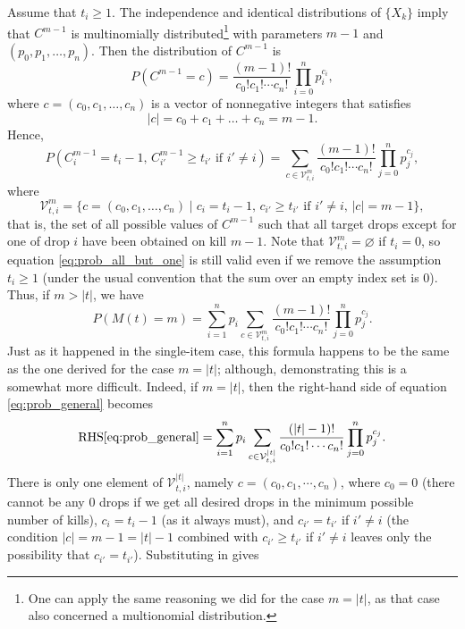 \documentclass[letterpaper]{article}
\begin{document}
	Assume that $t_i \ge 1$. The independence and identical distributions of $\{X_k\}$ imply that $C^{m-1}$ is multinomially distributed\footnote{One can apply the same reasoning we did for the case $m=|t|$, as that case also concerned a multionomial distribution.} with parameters $m-1$ and $(p_0, p_1, \dots, p_n)$. Then the distribution of $C^{m-1}$ is
	\begin{equation}
		P(C^{m-1} {=}c) = \frac{(m-1)!}{c_0!c_1!\cdots c_n!}\prod_{i=0}^n p_i^{c_i},
	\end{equation}
	where $c = (c_0, c_1, \dots, c_n)$ is a vector of nonnegative integers that satisfies 
	\begin{equation*}
		|c| = c_0  +c_1 + \dots + c_n = m-1.
	\end{equation*}
	Hence,
	\newcommand{\valid}[3]{\mathcal{V}_{#1, #2}^{#3}}
	\begin{equation}
		\label{eq:prob_all_but_one}
		P(C_i^{m-1}{=}t_i-1,\,C_{i'}^{m-1}{\ge}t_{i'} \text{ if } i'\ne i) = \sum_{c \in \valid{t}{i}{m}}\frac{(m-1)!}{c_0!c_1!\cdots c_n!}\prod_{j=0}^n p_j^{c_j},
	\end{equation}
	where
	\begin{equation}
		\valid{t}{i}{m} = \big\{c{=}(c_0,c_1,\dots, c_n) \mid  c_i{=} t_i-1, \, c_{i'} \ge t_{i'} \text{ if } i' {\ne} i, \, |c| {=} m-1\big\},
	\end{equation}
	that is, the set of all possible values of $C^{m-1}$ such that all target drops except for one of drop $i$ have been obtained on kill $m-1$. Note that $\valid{t}{i}{m} = \varnothing$ if $t_i = 0$, so equation \eqref{eq:prob_all_but_one} is still valid even if we remove the assumption $t_i \ge 1$ (under the usual convention that the sum over an empty index set is 0). Thus, if $m > |t|$, we have
	\begin{equation}
		\label{eq:prob_general}
		P(M(t){=}m) = \sum_{i=1}^np_i\sum_{c\in\valid{t}{i}{m}}\frac{(m-1)!}{c_0!c_1!\cdots c_n!}\prod_{j=0}^n p_j^{c_j}.
	\end{equation}
	Just as it happened in the single-item case, this formula happens to be the same as the one derived for the case $m = |t|$; although, demonstrating this is a somewhat more difficult. Indeed, if $m = |t|$, then the right-hand side of equation \eqref{eq:prob_general} becomes
	\begin{equation*}
		\text{RHS}\eqref{eq:prob_general} = \sum_{i=1}^np_i\sum_{c\in\valid{t}{i}{|t|}}\frac{(|t|-1)!}{c_0!c_1!\cdots c_n!}\prod_{j=0}^np_j^{c_j}.
	\end{equation*}
	There is only one element of $\valid{t}{i}{|t|}$, namely $c = (c_0,c_1,\cdots, c_n)$, where $c_0 = 0$ (there cannot be any 0 drops if we get all desired drops in the minimum possible number of kills), $c_i = t_i-1$ (as it always must), and $c_{i'} = t_{i'}$ if $i' \ne i$ (the condition $|c| = m - 1 = |t|-1$ combined with $c_{i'} \ge t_{i'}$ if $i' \ne i$ leaves only the possibility that $c_{i'} = t_{i'}$). Substituting in gives
\end{document}
